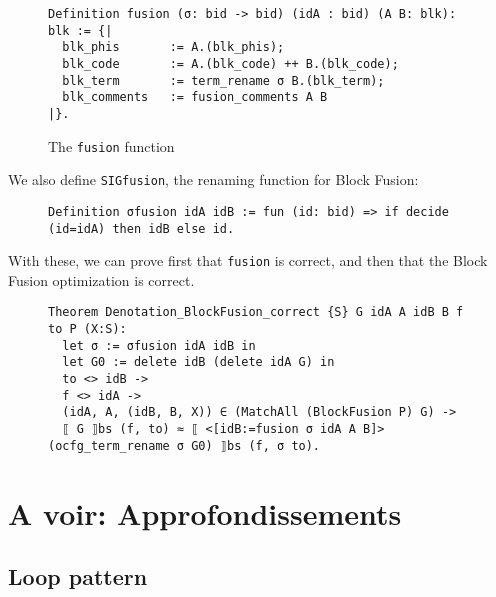\documentclass[11pt]{article}
\newcommand{\inlinecoq}[1]{\mbox{\lstinline[style=customcoq,columns=fixed,basewidth=.48em]{#1}}}
\newcommand{\ilc}[1]{\inlinecoq{#1}}
\begin{document}
\begin{figure}[H]
  \begin{lstlisting}[style=customcoq,basicstyle=\small\ttfamily]
Definition fusion (σ: bid -> bid) (idA : bid) (A B: blk): blk := {|
  blk_phis       := A.(blk_phis);
  blk_code       := A.(blk_code) ++ B.(blk_code);
  blk_term       := term_rename σ B.(blk_term);
  blk_comments   := fusion_comments A B
|}.
  \end{lstlisting}
  \caption{The \ilc{fusion} function}
\end{figure}

We also define \ilc{SIGfusion}, the renaming function for Block Fusion:

\begin{figure}[H]
  \begin{lstlisting}[style=customcoq,basicstyle=\small\ttfamily]
Definition σfusion idA idB := fun (id: bid) => if decide (id=idA) then idB else id.
  \end{lstlisting}
\end{figure}

With these, we can prove first that \ilc{fusion} is correct, and then that the Block Fusion optimization is correct.

\begin{figure}[H]
  \begin{lstlisting}[style=customcoq,basicstyle=\small\ttfamily]
Theorem Denotation_BlockFusion_correct {S} G idA A idB B f to P (X:S):
  let σ := σfusion idA idB in
  let G0 := delete idB (delete idA G) in
  to <> idB ->
  f <> idA ->
  (idA, A, (idB, B, X)) ∈ (MatchAll (BlockFusion P) G) ->
  ⟦ G ⟧bs (f, to) ≈ ⟦ <[idB:=fusion σ idA A B]> (ocfg_term_rename σ G0) ⟧bs (f, σ to).
      \end{lstlisting}
\end{figure}

\section{A voir: Approfondissements}
\label{sec:appr}

\subsection{Loop pattern}

\end{document}
